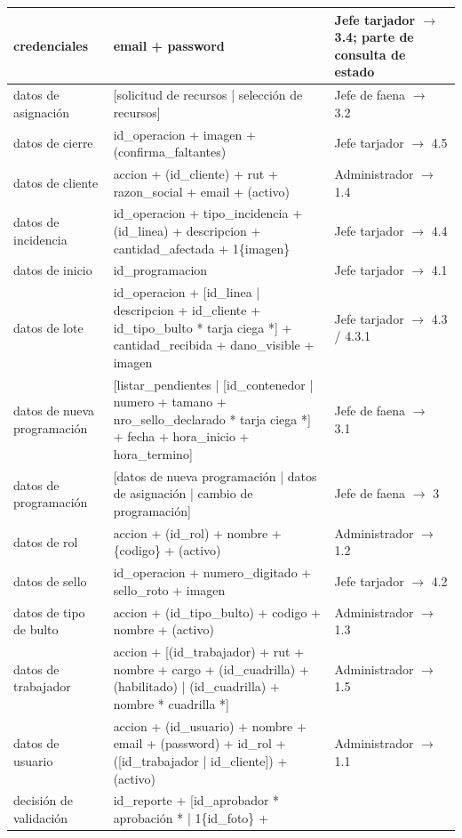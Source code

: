 {\begin{longtable}{|L{3.4cm}|L{7.2cm}|L{4.0cm}|}
credenciales & email + password & Jefe tarjador $\rightarrow$ 3.4; parte de consulta de estado
\\ \hline
datos de asignación & [solicitud de recursos | selección de recursos] & Jefe de faena
$\rightarrow$ 3.2 \\ \hline
datos de cierre & id\_operacion + imagen + (confirma\_faltantes) & Jefe tarjador
$\rightarrow$ 4.5 \\ \hline
datos de cliente & accion + (id\_cliente) + rut + razon\_social + email + (activo) &
Administrador $\rightarrow$ 1.4 \\ \hline
datos de incidencia & id\_operacion + tipo\_incidencia + (id\_linea) + descripcion +
cantidad\_afectada + 1\{imagen\} & Jefe tarjador $\rightarrow$ 4.4 \\ \hline
datos de inicio & id\_programacion & Jefe tarjador $\rightarrow$ 4.1 \\ \hline
datos de lote & id\_operacion + [id\_linea | descripcion + id\_cliente + id\_tipo\_bulto *
tarja ciega *] + cantidad\_recibida + dano\_visible + imagen & Jefe tarjador $\rightarrow$
4.3 / 4.3.1 \\ \hline
datos de nueva programación & [listar\_pendientes | [id\_contenedor | numero + tamano +
nro\_sello\_declarado * tarja ciega *] + fecha + hora\_inicio + hora\_termino] & Jefe de faena
$\rightarrow$ 3.1 \\ \hline
datos de programación & [datos de nueva programación | datos de asignación | cambio de
programación] & Jefe de faena $\rightarrow$ 3 \\ \hline
datos de rol & accion + (id\_rol) + nombre + \{codigo\} + (activo) & Administrador
$\rightarrow$ 1.2 \\ \hline
datos de sello & id\_operacion + numero\_digitado + sello\_roto + imagen & Jefe tarjador
$\rightarrow$ 4.2 \\ \hline
datos de tipo de bulto & accion + (id\_tipo\_bulto) + codigo + nombre + (activo) &
Administrador $\rightarrow$ 1.3 \\ \hline
datos de trabajador & accion + [(id\_trabajador) + rut + nombre + cargo + (id\_cuadrilla) +
(habilitado) | (id\_cuadrilla) + nombre * cuadrilla *] & Administrador $\rightarrow$ 1.5
\\ \hline
datos de usuario & accion + (id\_usuario) + nombre + email + (password) + id\_rol +
([id\_trabajador | id\_cliente]) + (activo) & Administrador $\rightarrow$ 1.1 \\ \hline
decisión de validación & id\_reporte + [id\_aprobador * aprobación * | 1\{id\_foto\} +

\end{longtable}}
